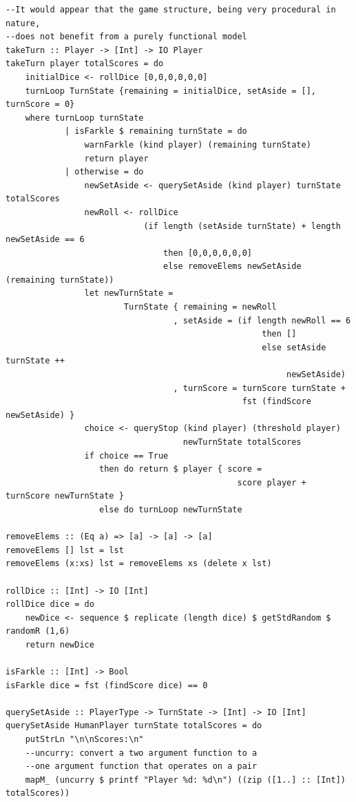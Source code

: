 \documentclass{article}
\begin{document}
\begin{lstlisting}
--It would appear that the game structure, being very procedural in nature,
--does not benefit from a purely functional model
takeTurn :: Player -> [Int] -> IO Player
takeTurn player totalScores = do
    initialDice <- rollDice [0,0,0,0,0,0]
    turnLoop TurnState {remaining = initialDice, setAside = [], turnScore = 0} 
    where turnLoop turnState
            | isFarkle $ remaining turnState = do
                warnFarkle (kind player) (remaining turnState)
                return player
            | otherwise = do
                newSetAside <- querySetAside (kind player) turnState totalScores
                newRoll <- rollDice
                            (if length (setAside turnState) + length newSetAside == 6
                                then [0,0,0,0,0,0]
                                else removeElems newSetAside (remaining turnState))
                let newTurnState =
                        TurnState { remaining = newRoll
                                  , setAside = (if length newRoll == 6
                                                    then []
                                                    else setAside turnState ++
                                                         newSetAside)
                                  , turnScore = turnScore turnState +
                                                fst (findScore newSetAside) }
                choice <- queryStop (kind player) (threshold player)
                                    newTurnState totalScores
                if choice == True
                   then do return $ player { score = 
                                               score player + turnScore newTurnState }
                   else do turnLoop newTurnState

removeElems :: (Eq a) => [a] -> [a] -> [a]
removeElems [] lst = lst
removeElems (x:xs) lst = removeElems xs (delete x lst)

rollDice :: [Int] -> IO [Int]
rollDice dice = do
    newDice <- sequence $ replicate (length dice) $ getStdRandom $ randomR (1,6)
    return newDice

isFarkle :: [Int] -> Bool
isFarkle dice = fst (findScore dice) == 0

querySetAside :: PlayerType -> TurnState -> [Int] -> IO [Int]
querySetAside HumanPlayer turnState totalScores = do
    putStrLn "\n\nScores:\n"
    --uncurry: convert a two argument function to a
    --one argument function that operates on a pair
    mapM_ (uncurry $ printf "Player %d: %d\n") ((zip ([1..] :: [Int]) totalScores))


\end{lstlisting}
\end{document}
